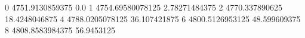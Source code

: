 0 4751.9130859375 0.0
1 4754.69580078125 2.78271484375
2 4770.337890625 18.4248046875
4 4788.0205078125 36.107421875
6 4800.5126953125 48.599609375
8 4808.8583984375 56.9453125
